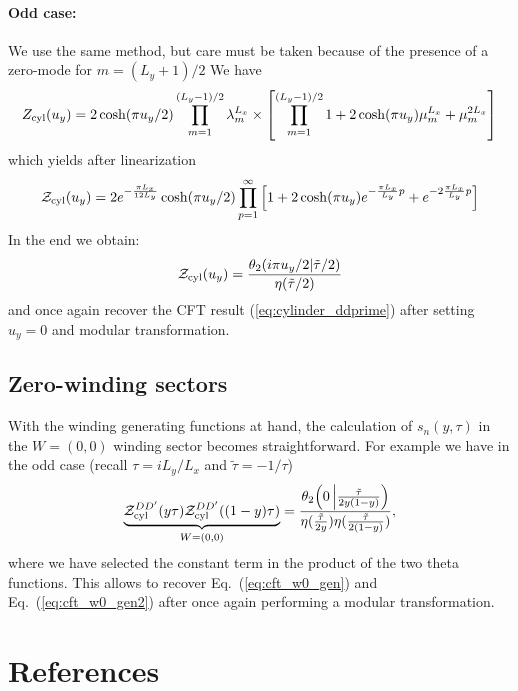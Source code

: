 \documentclass[11pt]{iopart}
\begin{document}
\paragraph{Odd case:}
We use the same method, but care must be taken because of the presence of a zero-mode for $m=(L_y+1)/2$ We have
\begin{equation}
Z_{\rm cyl}(u_y)=2\cosh(\pi u_y/2)\prod_{m=1}^{(L_y-1)/2} \lambda_m^{L_x}\times \left[\prod_{m=1}^{(L_y-1)/2} 1+2\cosh (\pi u_y)\mu_m^{L_x}+\mu_m^{2L_x}\right] 
\end{equation}
which yields after linearization
\begin{equation}
 \mathcal{Z}_{\rm cyl}(u_y)=2 e^{-\frac{\pi L_x}{12 L_y}}\cosh(\pi u_y/2)\prod_{p=1}^{\infty}\left[1+2 \cosh (\pi u_y)e^{-\frac{\pi L_x}{L_y}p}+e^{-2\frac{\pi L_x}{L_y}p}\right]
\end{equation}
In the end we obtain:
\begin{equation}
 \mathcal{Z}_{\rm cyl}(u_y)=\frac{\theta_2(i \pi u_y/2|\tilde{\tau}/2)}{\eta(\tilde{\tau}/2)}
\end{equation}
and once again recover the CFT result (\ref{eq:cylinder_ddprime}) after setting $u_y=0$ and modular transformation. 
\subsection[\;\;\;\;\;\;\;\;\;\;\;\;\;\; Zero-winding sectors]{Zero-winding sectors}
With the winding generating functions at hand, the calculation of $s_n(y,\tau)$ in the $W=(0,0)$ winding sector becomes straightforward. For example we have in the odd case (recall $\tau=iL_y/L_x$ and $\tilde{\tau}=-1/\tau$)
\begin{equation}
 \underbrace{\mathcal{Z}_{\rm cyl}^{DD^\prime}(y\tau)\mathcal{Z}_{\rm cyl}^{DD^\prime}((1-y)\tau)}_{W=(0,0)}=\frac{\theta_2\Big(0\left|\frac{\tilde{\tau}}{2y(1-y)}\right)}{\eta(\frac{\tilde{\tau}}{2y})\eta(\frac{\tilde{\tau}}{2(1-y)})},
\end{equation}
where we have selected the constant term in the product of the two theta functions.  
This allows to recover Eq.~(\ref{eq:cft_w0_gen}) and Eq.~(\ref{eq:cft_w0_gen2}) after once again performing a modular transformation. 
 \section*{References}
{}

\end{document}

